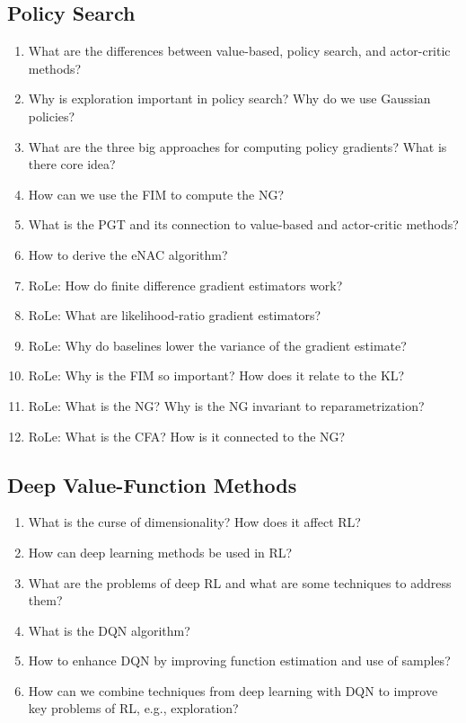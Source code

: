 		\subsection{Policy Search}
			\begin{enumerate}
				\item What are the differences between value-based, policy search, and actor-critic methods?
				\item Why is exploration important in policy search? Why do we use Gaussian policies?
				\item What are the three big approaches for computing policy gradients? What is there core idea?
				\item How can we use the \ac{FIM} to compute the \ac{NG}?
				\item What is the \ac{PGT} and its connection to value-based and actor-critic methods?
				\item How to derive the \ac{eNAC} algorithm?
				\item RoLe: How do finite difference gradient estimators work?
				\item RoLe: What are likelihood-ratio gradient estimators?
				\item RoLe: Why do baselines lower the variance of the gradient estimate?
				\item RoLe: Why is the \ac{FIM} so important? How does it relate to the \ac{KL}?
				\item RoLe: What is the \ac{NG}? Why is the \ac{NG} invariant to reparametrization?
				\item RoLe: What is the \ac{CFA}? How is it connected to the \ac{NG}?
			\end{enumerate}

		\subsection{Deep Value-Function Methods}
			\begin{enumerate}
				\item What is the curse of dimensionality? How does it affect \ac{RL}?
				\item How can deep learning methods be used in \ac{RL}?
				\item What are the problems of deep \ac{RL} and what are some techniques to address them?
				\item What is the \ac{DQN} algorithm?
				\item How to enhance \ac{DQN} by improving function estimation and use of samples?
				\item How can we combine techniques from deep learning with \ac{DQN} to improve key problems of \ac{RL}, e.g., exploration?
			\end{enumerate}

